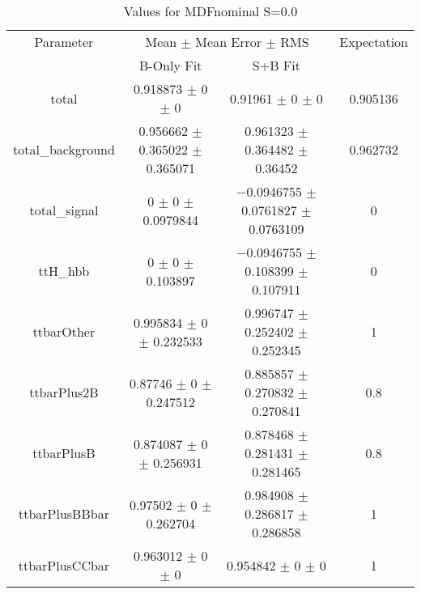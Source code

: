 \begin{table}
\centering
\caption{Values for MDFnominal S=0.0}
\begin{tabular}{cccc}
\toprule
Parameter & \multicolumn{2}{c}{Mean $\pm$ Mean Error $\pm$ RMS} & Expectation\\
 & B-Only Fit & S+B Fit & \\
\midrule
total & \num{0.918873} $\pm$ \num{0} $\pm$ \num{0} & \num{0.91961} $\pm$ \num{0} $\pm$ \num{0} & \num{0.905136}\\
total\_background & \num{0.956662} $\pm$ \num{0.365022} $\pm$ \num{0.365071} & \num{0.961323} $\pm$ \num{0.364482} $\pm$ \num{0.36452} & \num{0.962732}\\
total\_signal & \num{0} $\pm$ \num{0} $\pm$ \num{0.0979844} & \num{-0.0946755} $\pm$ \num{0.0761827} $\pm$ \num{0.0763109} & \num{0}\\
ttH\_hbb & \num{0} $\pm$ \num{0} $\pm$ \num{0.103897} & \num{-0.0946755} $\pm$ \num{0.108399} $\pm$ \num{0.107911} & \num{0}\\
ttbarOther & \num{0.995834} $\pm$ \num{0} $\pm$ \num{0.232533} & \num{0.996747} $\pm$ \num{0.252402} $\pm$ \num{0.252345} & \num{1}\\
ttbarPlus2B & \num{0.87746} $\pm$ \num{0} $\pm$ \num{0.247512} & \num{0.885857} $\pm$ \num{0.270832} $\pm$ \num{0.270841} & \num{0.8}\\
ttbarPlusB & \num{0.874087} $\pm$ \num{0} $\pm$ \num{0.256931} & \num{0.878468} $\pm$ \num{0.281431} $\pm$ \num{0.281465} & \num{0.8}\\
ttbarPlusBBbar & \num{0.97502} $\pm$ \num{0} $\pm$ \num{0.262704} & \num{0.984908} $\pm$ \num{0.286817} $\pm$ \num{0.286858} & \num{1}\\
ttbarPlusCCbar & \num{0.963012} $\pm$ \num{0} $\pm$ \num{0} & \num{0.954842} $\pm$ \num{0} $\pm$ \num{0} & \num{1}\\
\bottomrule
\end{tabular}
\end{table}